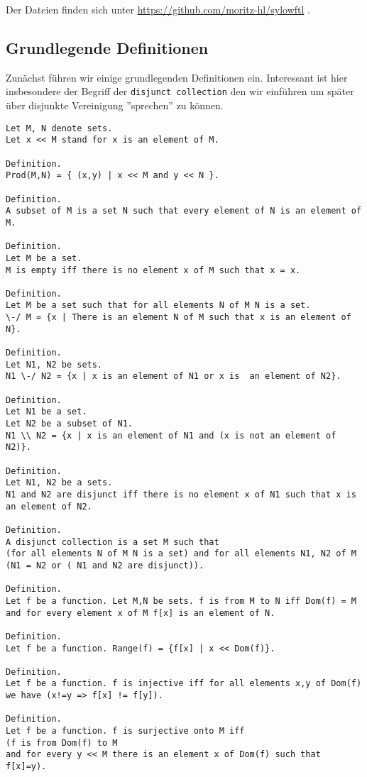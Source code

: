 \documentclass[a4paper,12pt]{scrartcl}
\begin{document}
Der Dateien finden sich unter \url{https://github.com/moritz-hl/sylowftl} \cite{bibtex.g}.

\subsection{Grundlegende Definitionen}

Zunächst führen wir einige grundlegenden Definitionen ein.
Interessant ist hier insbesondere der Begriff der \verb!disjunct collection! den wir einführen um später über disjunkte Vereinigung ''sprechen'' zu können.

\begin{lstlisting}
Let M, N denote sets.
Let x << M stand for x is an element of M.

Definition.
Prod(M,N) = { (x,y) | x << M and y << N }.

Definition.
A subset of M is a set N such that every element of N is an element of M.

Definition.
Let M be a set.
M is empty iff there is no element x of M such that x = x.

Definition.
Let M be a set such that for all elements N of M N is a set.
\-/ M = {x | There is an element N of M such that x is an element of N}.

Definition.
Let N1, N2 be sets.
N1 \-/ N2 = {x | x is an element of N1 or x is  an element of N2}.

Definition.
Let N1 be a set.
Let N2 be a subset of N1.
N1 \\ N2 = {x | x is an element of N1 and (x is not an element of N2)}.

Definition.
Let N1, N2 be a sets.
N1 and N2 are disjunct iff there is no element x of N1 such that x is an element of N2.

Definition.
A disjunct collection is a set M such that 
(for all elements N of M N is a set) and for all elements N1, N2 of M (N1 = N2 or ( N1 and N2 are disjunct)).

Definition.
Let f be a function. Let M,N be sets. f is from M to N iff Dom(f) = M and for every element x of M f[x] is an element of N.

Definition.
Let f be a function. Range(f) = {f[x] | x << Dom(f)}.

Definition.
Let f be a function. f is injective iff for all elements x,y of Dom(f) we have (x!=y => f[x] != f[y]).

Definition.
Let f be a function. f is surjective onto M iff 
(f is from Dom(f) to M 
and for every y << M there is an element x of Dom(f) such that f[x]=y).
\end{lstlisting}
\end{document}

